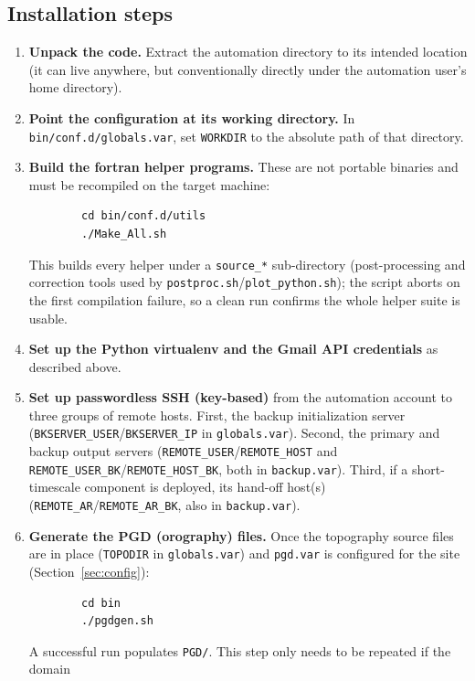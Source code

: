 \subsection{Installation steps}
\begin{enumerate}
  \item \textbf{Unpack the code.} Extract the automation directory to its intended location (it can
        live anywhere, but conventionally directly under the automation user's home directory).
  \item \textbf{Point the configuration at its working directory.} In
        \texttt{bin/conf.d/globals.var}, set \texttt{WORKDIR} to the absolute path of that directory.
  \item \textbf{Build the fortran helper programs.} These are not portable binaries and must be
        recompiled on the target machine:
        \begin{lstlisting}
        cd bin/conf.d/utils
        ./Make_All.sh
        \end{lstlisting}
        This builds every helper under a \texttt{source\_*} sub-directory (post-processing and
        correction tools used by \texttt{postproc.sh}\slash\texttt{plot\_python.sh}); the script aborts
        on the first compilation failure, so a clean run confirms the whole helper suite is usable.
  \item \textbf{Set up the Python virtualenv and the Gmail API credentials} as described above.
  \item \textbf{Set up passwordless SSH (key-based)} from the automation account to three groups of
        remote hosts. First, the backup initialization server
        (\texttt{BKSERVER\_USER}\slash\texttt{BKSERVER\_IP} in \texttt{globals.var}). Second, the
        primary and backup output servers (\texttt{REMOTE\_USER}\slash\texttt{REMOTE\_HOST} and
        \texttt{REMOTE\_USER\_BK}\slash\texttt{REMOTE\_HOST\_BK}, both in \texttt{backup.var}). Third,
        if a short-timescale component is deployed, its hand-off host(s)
        (\texttt{REMOTE\_AR}\slash\texttt{REMOTE\_AR\_BK}, also in \texttt{backup.var}).
  \item \textbf{Generate the PGD (orography) files.} Once the topography source files are in place
        (\texttt{TOPODIR} in \texttt{globals.var}) and \texttt{pgd.var} is configured for the site
        (Section~\ref{sec:config}):
        \begin{lstlisting}
        cd bin
        ./pgdgen.sh
        \end{lstlisting}
        A successful run populates \texttt{PGD/}. This step only needs to be repeated if the domain

\end{enumerate}

